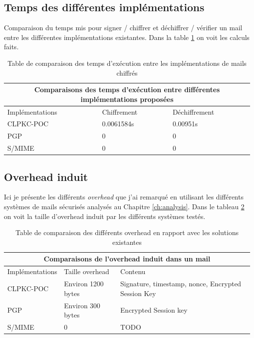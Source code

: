 \subsection{Temps des différentes implémentations}
Comparaison du temps mis pour signer / chiffrer et déchiffrer / vérifier un mail entre les différentes implémentations existantes. Dans la table \ref{table:comparisonTime} on voit les calculs faits.
\begin{table}[h!]
	\centering
	\begin{tabular}{ |p{3cm}||p{3cm}|p{3cm}| }
		\hline
		\multicolumn{3}{|c|}{Comparaisons des temps d'exécution entre différentes implémentations proposées} \\
		\hline
		Implémentations & Chiffrement & Déchiffrement\\
		\hline
		CLPKC-POC   & 0.0061584s & 0.00951s\\
		PGP & 0 & 0\\
		S/MIME & 0 & 0\\
		\hline
	\end{tabular}
	\caption{Table de comparaison des temps d'exécution entre les implémentations de mails chiffrés}
	\label{table:comparisonTime}
\end{table}
\subsection{Overhead induit}
Ici je présente les différents \textit{overhead} que j'ai remarqué en utilisant les différents systèmes de mails sécurisés analysés au Chapitre \ref{ch:analysis}. Dans le tableau \ref{table:comparisonOverhead} on voit la taille d'overhead induit par les différents systèmes testés.
\begin{table}[h!]
	\centering
	\begin{tabular}{ |p{3cm}||p{4cm}|p{6cm}| }
		\hline
		\multicolumn{3}{|c|}{Comparaisons de l'overhead induit dans un mail} \\
		\hline
		Implémentations & Taille overhead & Contenu\\
		\hline
		CLPKC-POC   & Environ 1200 bytes & Signature, timestamp, nonce, Encrypted Session Key\\
		PGP & Environ 300 bytes & Encrypted Session key\\
		S/MIME & 0 & TODO\\
		\hline
	\end{tabular}
	\caption{Table de comparaison des différents overhead en rapport avec les solutions existantes }
	\label{table:comparisonOverhead}
\end{table}

